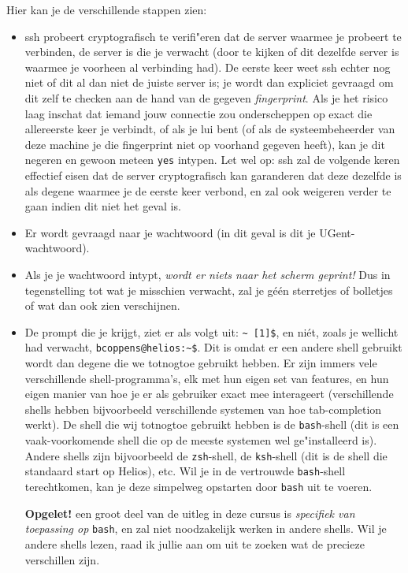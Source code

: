 \documentclass[a4paper,twoside,openany]{memoir}
\begin{document}
Hier kan je de verschillende stappen zien:
\begin{itemize}
\item ssh probeert cryptografisch te verifi"eren dat de server waarmee je
  probeert te verbinden, de server is die je verwacht (door te kijken of dit
    dezelfde server is waarmee je voorheen al verbinding had). De eerste keer
    weet ssh echter nog niet of dit al dan niet de juiste server is; je wordt
    dan expliciet gevraagd om dit zelf te checken aan de hand van de gegeven
    \emph{fingerprint}. Als je het risico laag inschat dat iemand jouw
    connectie zou onderscheppen op exact die allereerste keer je verbindt, of
    als je lui bent (of als de systeembeheerder van deze machine je die
    fingerprint niet op voorhand gegeven heeft), kan je dit negeren en gewoon
    meteen \verb!yes! intypen. Let wel op: ssh zal de volgende keren effectief
    eisen dat de server cryptografisch kan garanderen dat deze dezelfde is als
    degene waarmee je de eerste keer verbond, en zal ook weigeren verder te
    gaan indien dit niet het geval is.

\item Er wordt gevraagd naar je wachtwoord (in dit geval is dit je UGent-wachtwoord).

\item Als je je wachtwoord intypt, \emph{wordt er niets naar het scherm
  geprint!} Dus in tegenstelling tot wat je misschien verwacht, zal je géén
    sterretjes of bolletjes of wat dan ook zien verschijnen.

\item De prompt die je krijgt, ziet er als volgt uit: \verb!~ [1]$!, en niét,
  zoals je wellicht had verwacht, \verb!bcoppens@helios:~$!. Dit is omdat er
    een andere shell gebruikt wordt dan degene die we totnogtoe gebruikt
    hebben. Er zijn immers vele verschillende shell-programma's, elk met hun
    eigen set van features, en hun eigen manier van hoe je er als gebruiker
    exact mee interageert (verschillende shells hebben bijvoorbeeld
    verschillende systemen van hoe tab-completion werkt). De shell die wij
    totnogtoe gebruikt hebben is de \verb!bash!-shell (dit is een
    vaak-voorkomende shell die op de meeste systemen wel ge"installeerd is).
    Andere shells zijn bijvoorbeeld de \verb!zsh!-shell, de \verb!ksh!-shell
    (dit is de shell die standaard start op Helios), etc. Wil je in de
    vertrouwde \verb!bash!-shell terechtkomen, kan je deze simpelweg opstarten
    door \verb!bash! uit te voeren.

    \textbf{Opgelet!} een groot deel van de uitleg in deze cursus is \emph{specifiek van toepassing op} \verb!bash!, en zal
    niet noodzakelijk werken in andere shells. Wil je andere shells lezen, raad ik jullie aan om uit te zoeken wat de precieze
    verschillen zijn.
\end{itemize}
\end{document}
